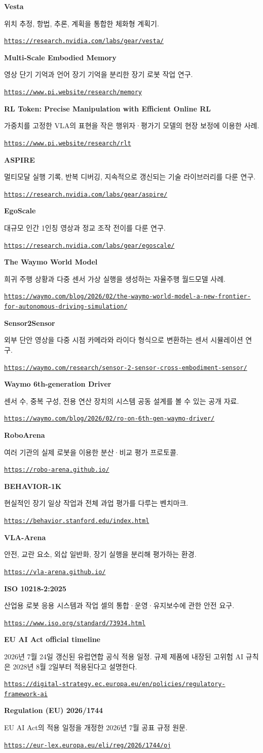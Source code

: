 \documentclass[11pt,openany]{book}
\newcommand{\sourceitem}[3]{%
  \par\smallskip\noindent
  {\sffamily\bfseries\color{deepblue}#1}\par
  {\footnotesize #2\par\href{#3}{\nolinkurl{#3}}}\par
}
\begin{document}
\sourceitem{Vesta}
{위치 추정, 항법, 추론, 계획을 통합한 체화형 계획기.}
{https://research.nvidia.com/labs/gear/vesta/}

\sourceitem{Multi-Scale Embodied Memory}
{영상 단기 기억과 언어 장기 기억을 분리한 장기 로봇 작업 연구.}
{https://www.pi.website/research/memory}

\sourceitem{RL Token: Precise Manipulation with Efficient Online RL}
{가중치를 고정한 VLA의 표현을 작은 행위자·평가기 모델의 현장 보정에 이용한 사례.}
{https://www.pi.website/research/rlt}

\sourceitem{ASPIRE}
{멀티모달 실행 기록, 반복 디버깅, 지속적으로 갱신되는 기술 라이브러리를 다룬 연구.}
{https://research.nvidia.com/labs/gear/aspire/}

\sourceitem{EgoScale}
{대규모 인간 1인칭 영상과 정교 조작 전이를 다룬 연구.}
{https://research.nvidia.com/labs/gear/egoscale/}

\sourceitem{The Waymo World Model}
{희귀 주행 상황과 다중 센서 가상 실행을 생성하는 자율주행 월드모델 사례.}
{https://waymo.com/blog/2026/02/the-waymo-world-model-a-new-frontier-for-autonomous-driving-simulation/}

\sourceitem{Sensor2Sensor}
{외부 단안 영상을 다중 시점 카메라와 라이다 형식으로 변환하는 센서 시뮬레이션 연구.}
{https://waymo.com/research/sensor-2-sensor-cross-embodiment-sensor/}

\sourceitem{Waymo 6th-generation Driver}
{센서 수, 중복 구성, 전용 연산 장치의 시스템 공동 설계를 볼 수 있는 공개 자료.}
{https://waymo.com/blog/2026/02/ro-on-6th-gen-waymo-driver/}

\sourceitem{RoboArena}
{여러 기관의 실제 로봇을 이용한 분산·비교 평가 프로토콜.}
{https://robo-arena.github.io/}

\sourceitem{BEHAVIOR-1K}
{현실적인 장기 일상 작업과 전체 과업 평가를 다루는 벤치마크.}
{https://behavior.stanford.edu/index.html}

\sourceitem{VLA-Arena}
{안전, 교란 요소, 외삽 일반화, 장기 실행을 분리해 평가하는 환경.}
{https://vla-arena.github.io/}

\sourceitem{ISO 10218-2:2025}
{산업용 로봇 응용 시스템과 작업 셀의 통합·운영·유지보수에 관한 안전 요구.}
{https://www.iso.org/standard/73934.html}

\sourceitem{EU AI Act official timeline}
{2026년 7월 24일 갱신된 유럽연합 공식 적용 일정. 규제 제품에 내장된 고위험 AI 규칙은 2028년 8월 2일부터 적용된다고 설명한다.}
{https://digital-strategy.ec.europa.eu/en/policies/regulatory-framework-ai}

\sourceitem{Regulation (EU) 2026/1744}
{EU AI Act의 적용 일정을 개정한 2026년 7월 공표 규정 원문.}
{https://eur-lex.europa.eu/eli/reg/2026/1744/oj}
\end{document}
